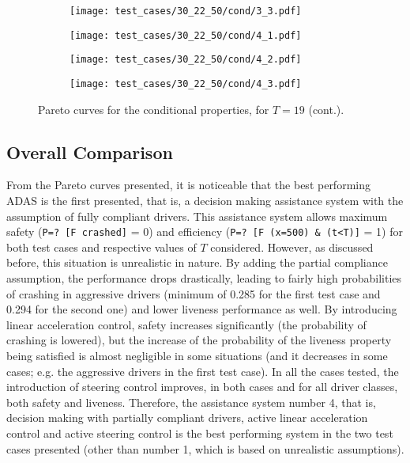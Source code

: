 \begin{figure}[H] \ContinuedFloat
\centering
\begin{subfigure}{0.49\textwidth}
  \centering
  \texttt{[image: test\_cases/30\_22\_50/cond/3\_3.pdf]}
\end{subfigure}
\begin{subfigure}{0.49\textwidth}
  \centering
  \texttt{[image: test\_cases/30\_22\_50/cond/4\_1.pdf]}
\end{subfigure} 
\begin{subfigure}{0.49\textwidth}
  \centering
  \texttt{[image: test\_cases/30\_22\_50/cond/4\_2.pdf]}
\end{subfigure}
\begin{subfigure}{0.49\textwidth}
  \centering
  \texttt{[image: test\_cases/30\_22\_50/cond/4\_3.pdf]}
\end{subfigure}
\caption{Pareto curves for the conditional properties, for $T = 19$ (cont.).}
\label{fig:test_case_2_cond}
\end{figure}

\subsection{Overall Comparison}

From the Pareto curves presented, it is noticeable that the best performing ADAS is the first presented, that is, a decision making assistance system with the assumption of fully compliant drivers. This assistance system allows maximum safety (\texttt{P=? [F crashed]} = 0) and efficiency (\texttt{P=? [F (x=500) \& (t<T)]} = 1) for both test cases and respective values of $T$ considered. However, as discussed before, this situation is unrealistic in nature. By adding the partial compliance assumption, the performance drops drastically, leading to fairly high probabilities of crashing in aggressive drivers (minimum of 0.285 for the first test case and 0.294 for the second one) and lower liveness performance as well. By introducing linear acceleration control, safety increases significantly (the probability of crashing is lowered), but the increase of the probability of the liveness property being satisfied is almost negligible in some situations (and it decreases in some cases; e.g. the aggressive drivers in the first test case). In all the cases tested, the introduction of steering control improves, in both cases and for all driver classes, both safety and liveness. Therefore, the assistance system number 4, that is, decision making with partially compliant drivers, active linear acceleration control and active steering control is the best performing system in the two test cases presented (other than number 1, which is based on unrealistic assumptions).

